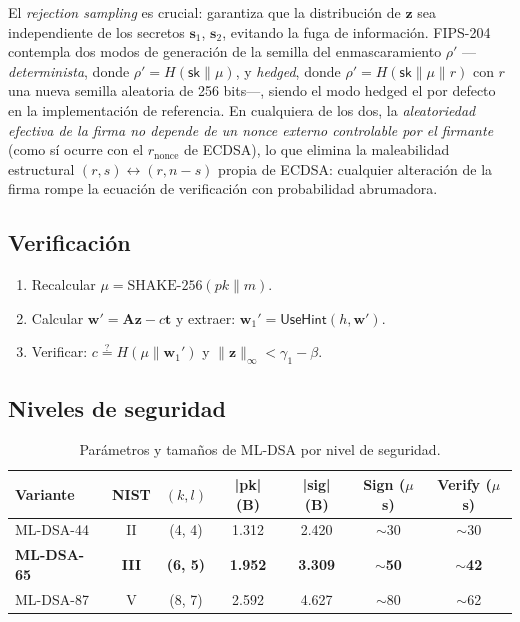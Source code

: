 El \emph{rejection sampling} es crucial: garantiza que la distribución de $\mathbf{z}$ sea independiente de los secretos $\mathbf{s}_1$, $\mathbf{s}_2$, evitando la fuga de información. FIPS-204 contempla dos modos de generación de la semilla del enmascaramiento $\rho'$ ---\emph{determinista}, donde $\rho' = H(\textsf{sk} \| \mu)$, y \emph{hedged}, donde $\rho' = H(\textsf{sk} \| \mu \| r)$ con $r$ una nueva semilla aleatoria de 256 bits---, siendo el modo hedged el por defecto en la implementación de referencia. En cualquiera de los dos, la \emph{aleatoriedad efectiva de la firma no depende de un nonce externo controlable por el firmante} (como sí ocurre con el $r_{\text{nonce}}$ de ECDSA), lo que elimina la maleabilidad estructural $(r, s) \leftrightarrow (r, n-s)$ propia de ECDSA: cualquier alteración de la firma rompe la ecuación de verificación con probabilidad abrumadora.

\subsection{Verificación}

\begin{enumerate}
  \item Recalcular $\mu = \text{SHAKE-256}(\mathit{pk} \| m)$.
  \item Calcular $\mathbf{w}' = \mathbf{A}\mathbf{z} - c\mathbf{t}$ y extraer: $\mathbf{w}_1' = \textsf{UseHint}(h, \mathbf{w}')$.
  \item Verificar: $c \stackrel{?}{=} H(\mu \| \mathbf{w}_1')$ y $\|\mathbf{z}\|_\infty < \gamma_1 - \beta$.
\end{enumerate}

\subsection{Niveles de seguridad}

\begin{table}[htbp]
\centering
\caption{Parámetros y tamaños de ML-DSA por nivel de seguridad.}
\label{tab:mldsa_params}
\begin{tabular}{@{}lcccccc@{}}
\toprule
\textbf{Variante} & \textbf{NIST} & $(k, l)$ & \textbf{|pk| (B)} & \textbf{|sig| (B)} & \textbf{Sign ($\mu$s)} & \textbf{Verify ($\mu$s)} \\
\midrule
ML-DSA-44 & II & (4, 4) & 1.312 & 2.420 & $\sim$30 & $\sim$30 \\
\textbf{ML-DSA-65} & \textbf{III} & \textbf{(6, 5)} & \textbf{1.952} & \textbf{3.309} & $\boldsymbol{\sim}$\textbf{50} & $\boldsymbol{\sim}$\textbf{42} \\
ML-DSA-87 & V & (8, 7) & 2.592 & 4.627 & $\sim$80 & $\sim$62 \\
\bottomrule
\end{tabular}
\end{table}

